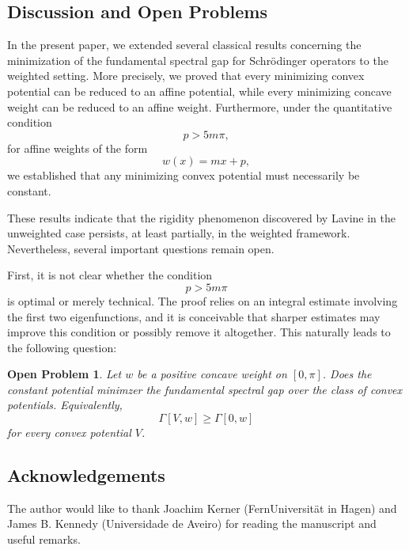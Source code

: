 \documentclass[12pt,a4paper]{amsart}
\newtheorem{opn}[defi]{Open Problem}%
\begin{document}



\subsection{Discussion and Open Problems}

In the present paper, we extended several classical results concerning the minimization of the fundamental spectral gap for Schr\"odinger operators to the weighted setting. More precisely, we proved that every minimizing convex potential can be reduced to an affine potential, while every minimizing concave weight can be reduced to an affine weight. Furthermore, under the quantitative condition
\[
p>5m\pi,
\]
for affine weights of the form
\[
w(x)=mx+p,
\]
we established that any minimizing convex potential must necessarily be constant.

These results indicate that the rigidity phenomenon discovered by Lavine in the unweighted case persists, at least partially, in the weighted framework. Nevertheless, several important questions remain open.

First, it is not clear whether the condition
\[
p>5m\pi
\]
is optimal or merely technical. The proof relies on an integral estimate involving the first two eigenfunctions, and it is conceivable that sharper estimates may improve this condition or possibly remove it altogether. This naturally leads to the following question:

\begin{opn}    
Let $w$ be a positive concave weight on $[0,\pi]$. Does the constant potential minimzer the fundamental spectral gap over the class of convex potentials. Equivalently, 
$$ \Gamma[V,w]\geq \Gamma[0,w]
$$
for every convex potential $V$.
\end{opn}





\subsection*{Acknowledgements} The author would like to thank Joachim Kerner (FernUniversität in Hagen) and James B. Kennedy (Universidade de Aveiro) for reading the manuscript and useful remarks. 
\end{document}

